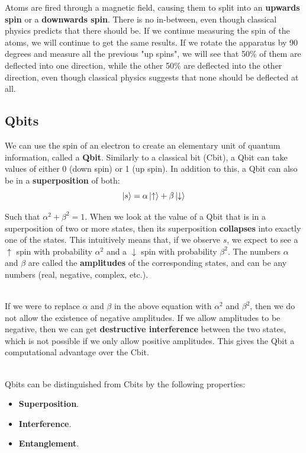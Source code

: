 \documentclass[12pt]{article}
\begin{document}
\noindent
Atoms are fired through a magnetic field, causing them to split into an \textbf{upwards spin} or a \textbf{downwards spin}.
There is no in-between, even though classical physics predicts that there should be.
If we continue measuring the spin of the atoms, we will continue to get the same results.
If we rotate the apparatus by 90 degrees and measure all the previous "up spins", we will see that 50\% of them are deflected into one direction, while the other 50\% are deflected into the other direction, even though classical physics suggests that none should be deflected at all.

\subsection*{Qbits}
We can use the spin of an electron to create an elementary unit of quantum information, called a \textbf{Qbit}.
Similarly to a classical bit (Cbit), a Qbit can take values of either 0 (down spin) or 1 (up spin).
In addition to this, a Qbit can also be in a \textbf{superposition} of both:
\[ \ket{s} = \alpha \ket{\uparrow} + \beta \ket{\downarrow} \]

\noindent
Such that $\alpha^2 + \beta^2 = 1$.
When we look at the value of a Qbit that is in a superposition of two or more states, then its superposition \textbf{collapses} into exactly one of the states.
This intuitively means that, if we observe $s$, we expect to see a $\uparrow$ spin with probability $\alpha^2$ and a $\downarrow$ spin with probability $\beta^2$.
The numbers $\alpha$ and $\beta$ are called the \textbf{amplitudes} of the corresponding states, and can be any numbers (real, negative, complex, etc.).

\noindent
\\
If we were to replace $\alpha$ and $\beta$ in the above equation with $\alpha^2$ and $\beta^2$, then we do not allow the existence of negative amplitudes.
If we allow amplitudes to be negative, then we can get \textbf{destructive interference} between the two states, which is not possible if we only allow positive amplitudes.
This gives the Qbit a computational advantage over the Cbit.

\noindent
\\
Qbits can be distinguished from Cbits by the following properties:

\begin{itemize}
    \item \textbf{Superposition}.
    \item \textbf{Interference}.
    \item \textbf{Entanglement}.
\end{itemize}
\end{document}
